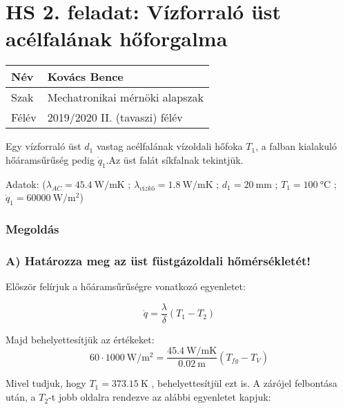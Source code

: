 
\section*{HS 2. feladat: Vízforraló üst acélfalának hőforgalma}

\begin{tabular}{ | p{2cm} | p{14cm} | } 
	\hline
	Név & Kovács Bence \\ 
	\hline
	Szak &  Mechatronikai mérnöki alapszak\\
	\hline
	Félév & 2019/2020 II. (tavaszi) félév \\ 
	\hline
\end{tabular}
\vspace{0.5cm}


Egy vízforraló üst $d_1$ vastag acélfalának vízoldali hőfoka $T_1$, a falban kialakuló hőáramsűrűség pedig $\dot{q}_1$.Az üst falát síkfalnak tekintjük.

\noindent Adatok:    
($\lambda_{AC} = \SI{45.4}{\watt\per\meter\kelvin}$ ;
$\lambda_{\textit{vízkő}} = \SI{1,8}{\watt\per\meter\kelvin}$ ; 
$d_1 = \SI{20}{\milli\meter}$ ; 
$T_1 = \SI{100}{\celsius} $ ; 
$\dot{q}_1 = \SI{60000}{\watt\per\meter\squared}$)

\vspace{3mm}

\hline
\subsubsection*{Megoldás}


\subsubsection*{A) Határozza meg az üst füstgázoldali hőmérsékletét!}


Először felírjuk a hőáramsűrűségre vonatkozó egyenletet:

\begin{equation}
	 \dot{q} = \frac{\lambda}{\delta} (T_1 - T_2)
\end{equation}


Majd behelyettesítjük az értékeket:
\begin{equation}
60 \cdot \SI{1000}{\watt\per\meter\squared} =  \frac{\SI{45.4}{\watt\per\meter\kelvin}}{\SI{0.02}{\meter}} (T_{fg} - T_V)
\end{equation}

Mivel tudjuk, hogy $T_1 = \SI{373.15}{\kelvin}$ , behelyettesítjül ezt is.
A zárójel felbontása után, a $T_2$-t jobb oldalra rendezve az alábbi egyenletet kapjuk:

